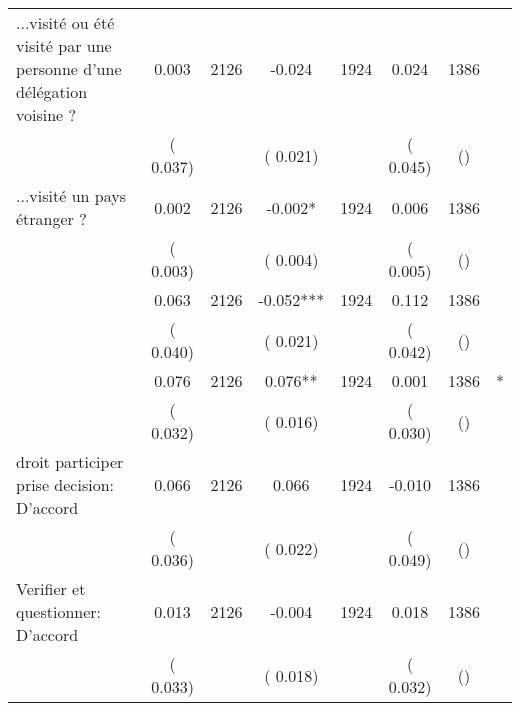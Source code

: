 \begin{tabular}{l*{6}{c}}
...visité ou été visité par une personne d'une délégation voisine ?        &              0.003      &       2126       &             -0.024      &       1924       &              0.024      &       1386  &  &              \\
                       &       (       0.037)            &                               &       (       0.021)            &                               &       (       0.045)            &       () &                  \\
...visité un pays étranger ?        &              0.002      &       2126       &             -0.002*      &       1924       &              0.006      &       1386  &  &              \\
                       &       (       0.003)            &                               &       (       0.004)            &                               &       (       0.005)            &       () &                  \\
        &              0.063      &       2126       &             -0.052***      &       1924       &              0.112      &       1386  &  &              \\
                       &       (       0.040)            &                               &       (       0.021)            &                               &       (       0.042)            &       () &                  \\
        &              0.076      &       2126       &              0.076**      &       1924       &              0.001      &       1386  & * &              \\
                       &       (       0.032)            &                               &       (       0.016)            &                               &       (       0.030)            &       () &                  \\
droit participer prise decision: D'accord        &              0.066      &       2126       &              0.066      &       1924       &             -0.010      &       1386  &  &              \\
                       &       (       0.036)            &                               &       (       0.022)            &                               &       (       0.049)            &       () &                  \\
Verifier et questionner: D'accord        &              0.013      &       2126       &             -0.004      &       1924       &              0.018      &       1386  &  &              \\
                       &       (       0.033)            &                               &       (       0.018)            &                               &       (       0.032)            &       () &                  \\
\hline \end{tabular}